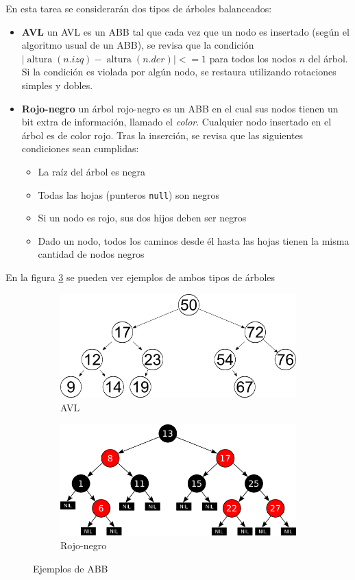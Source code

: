 \documentclass[dcc, usedate]{fcfmcourse}
\DeclareMathOperator{\altura}{altura}
\begin{document}
En esta tarea se considerarán dos tipos de árboles balanceados:
\begin{itemize}
	\item \textbf{AVL} un AVL es un ABB tal que cada vez que un nodo es insertado (según el algoritmo usual de un ABB), se revisa que la condición $|\altura{(n.izq)} - \altura{(n.der)}| <= 1$ para todos los nodos $n$ del árbol. Si la condición es violada por algún nodo, se restaura utilizando rotaciones simples y dobles.
	\item \textbf{Rojo-negro} un árbol rojo-negro es un ABB en el cual sus nodos tienen un bit extra de información, llamado el \textit{color}. Cualquier nodo insertado en el árbol es de color rojo. Tras la inserción, se revisa que las siguientes condiciones sean cumplidas:
	\begin{itemize}
		\item La raíz del árbol es negra
		\item Todas las hojas (punteros \texttt{null}) son negros
		\item Si un nodo es rojo, sus dos hijos deben ser negros
		\item Dado un nodo, todos los caminos desde él hasta las hojas tienen la misma cantidad de nodos negros
	\end{itemize}
\end{itemize}
En la figura \ref{fig:fig1} se pueden ver ejemplos de ambos tipos de árboles
\begin{figure}[h]
\begin{subfigure}{.5\textwidth}
  \centering
  \includegraphics[width=.8\linewidth]{AVLtreef.png}
  \caption{AVL}
  \label{fig:sfig1}
\end{subfigure}%
\begin{subfigure}{.5\textwidth}
  \centering
  \includegraphics[width=.8\linewidth]{Red-black_tree_example.png}
  \caption{Rojo-negro}
  \label{fig:sfig2}
\end{subfigure}
\caption{Ejemplos de ABB}
\label{fig:fig1}
\end{figure}
\end{document}
